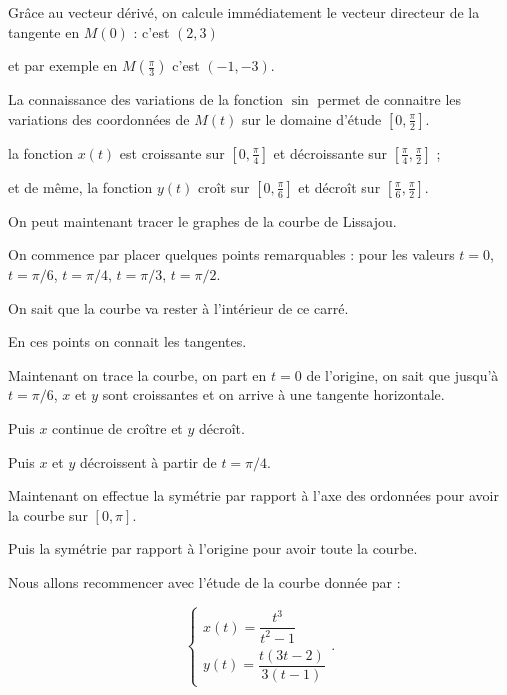 \change

Grâce au vecteur dérivé, on calcule immédiatement 
le vecteur directeur de la tangente en $M(0)$ : c'est $(2,3)$

\change
et par exemple en $M(\tfrac{\pi}{3})$  c'est $(-1,-3)$.



\diapo

La connaissance des variations de la fonction $\sin$ 
permet de connaitre les variations des coordonnées de $M(t)$ 
sur le domaine d'étude $[0,\frac{\pi}{2}]$.

\change
la fonction $x(t)$ est croissante sur $[0,\frac{\pi}{4}]$ 
et décroissante 
sur $[\frac{\pi}{4},\frac{\pi}{2}]$ ; 


\change
et de même, 
la fonction $y(t)$ croît sur $[0,\frac{\pi}{6}]$ et décroît 
sur $[\frac{\pi}{6},\frac{\pi}{2}]$.


\change
On peut maintenant tracer le graphes de la courbe de Lissajou.

On commence par placer quelques points remarquables :
pour les valeurs $t=0$, $t=\pi/6$, $t=\pi/4$,
$t=\pi/3$, $t = \pi/2$.

On sait que la courbe va rester à l'intérieur de ce carré.

\change
En ces points on connait les tangentes.

\change
Maintenant on trace la courbe, on part en $t=0$ de l'origine,
on sait que jusqu'à $t=\pi/6$, $x$ et $y$ sont croissantes
et on arrive à une tangente horizontale.

Puis $x$ continue de croître et $y$ décroît.

Puis $x$ et $y$ décroissent à partir de $t=\pi/4$.

\change
Maintenant on effectue la symétrie par rapport à l'axe des ordonnées pour avoir la courbe 
sur $[0,\pi]$. 

\change
Puis la symétrie par rapport à l'origine pour avoir 
toute la courbe.

\diapo

Nous allons recommencer avec l'étude de la courbe 
donnée par :

$$\left\{
\begin{array}{l}
x(t)=\dfrac{t^3}{t^2-1}\\[3mm]
y(t)=\dfrac{t(3t-2)}{3(t-1)}
\end{array}
\right..$$

\change


